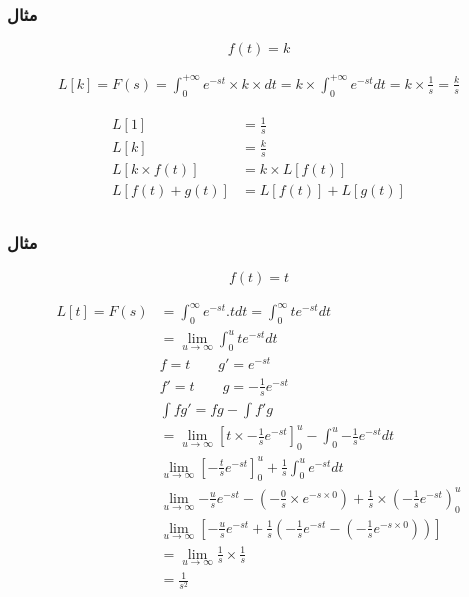 \documentclass[12pt]{book}
\begin{document}
\subsubsection{مثال}

$$
f(t) = k
$$

\begin{align*}
L[k] = F(s) = \int_{0}^{+ \infty}{ e^{-st} \times k \times dt} = k \times \int_{0}^{+ \infty}{e^{-st} dt} = k \times \frac{1}{s} = \frac{k}{s}
\end{align*}

\begin{tcolorbox}
\begin{align*}
L[1] &= \frac{1}{s}   \\
L[k] &= \frac{k}{s} \\
L[ k \times f(t) ] &= k \times L[f(t)] \\
L[ f(t) + g(t) ] &= L[f(t)] + L[g(t)] \\
\end{align*}
\end{tcolorbox}



\subsubsection{مثال}

$$
f(t) = t
$$

\begin{align*}
L[t] = F(s) &= \int_{0}^{\infty}{e^{-st} . t dt} = \int_{0}^{\infty}{t e^{-st} dt} \\
&= \lim_{u \to \infty}{ \int_{0}^{u}{t e^{-st} dt} } \\
& f = t \qquad g' = e^{-st} \\
& f' = t \qquad g = - \frac{1}{s} e^{-st} \\
& \int{fg'} = fg - \int{f'g} \\
&= \lim_{u \to \infty}{ \left[ t \times - \frac{1}{s} e^{-st} \right]_{0}^{u} } - \int_{0}^{u}{- \frac{1}{s} e^{-st} dt } \\
& \lim_{u \to \infty}{ \left[ - \frac{t}{s} e^{-st} \right]_{0}^{u}  } + \frac{1}{s} \int_{0}^{u}{e^{-st}dt} \\
& \lim_{u \to \infty}{ - \frac{u}{s} e^{-st} - \left( - \frac{0}{s} \times e^{-s \times 0} \right) + \frac{1}{s} \times \left( - \frac{1}{s} e^{-st} \right)_{0}^{u} } \\
& \lim_{u \to \infty}{ \left[ - \frac{u}{s} e^{-st} + \frac{1}{s} \left( - \frac{1}{s} e^{-st} - \left( - \frac{1}{s} e^{-s \times 0} \right) \right) \right] } \\
&= \lim_{u \to \infty}{ \frac{1}{s} \times \frac{1}{s} } \\
& = \frac{1}{s^{2}}
\end{align*}
\end{document}
